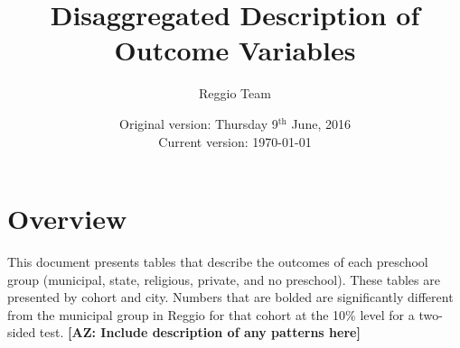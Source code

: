 \documentclass[12pt]{article}
\begin{document}
\title{Disaggregated Description of Outcome Variables}
\author{Reggio Team}
\date{Original version: Thursday 9$^{\text{th}}$ June, 2016 \\ Current version: \today \\ \currenttime}
\maketitle

\listoftables

\section{}

\section*{Overview}

This document presents tables that describe the outcomes of each preschool group (municipal, state, religious, private, and no preschool). These tables are presented by cohort and city. Numbers that are bolded are significantly different from the municipal group in Reggio for that cohort at the 10\% level for a two-sided test. \textbf{[AZ: Include description of any patterns here]}
\end{document}
